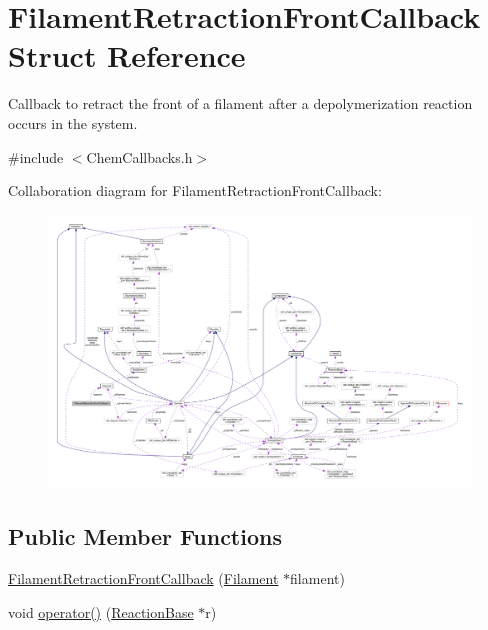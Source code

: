 \hypertarget{structFilamentRetractionFrontCallback}{\section{Filament\+Retraction\+Front\+Callback Struct Reference}
\label{structFilamentRetractionFrontCallback}
}


Callback to retract the front of a filament after a depolymerization reaction occurs in the system.  




{\ttfamily \#include $<$Chem\+Callbacks.\+h$>$}



Collaboration diagram for Filament\+Retraction\+Front\+Callback\+:\nopagebreak
\begin{figure}[H]
\begin{center}
\leavevmode
\includegraphics[width=350pt]{structFilamentRetractionFrontCallback__coll__graph}
\end{center}
\end{figure}
\subsection*{Public Member Functions}
\begin{DoxyCompactItemize}
\item 
\hyperlink{structFilamentRetractionFrontCallback_a0a6819d2d4b8766c242906a731fcc6dc}{Filament\+Retraction\+Front\+Callback} (\hyperlink{classFilament}{Filament} $\ast$filament)
\item 
void \hyperlink{structFilamentRetractionFrontCallback_a5679aab6f183c11ed3ae712fe85929e1}{operator()} (\hyperlink{classReactionBase}{Reaction\+Base} $\ast$r)
\end{DoxyCompactItemize}
